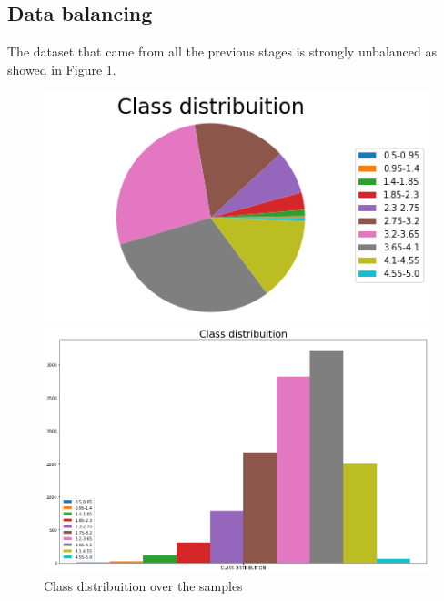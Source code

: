 \documentclass[../main]{subfiles}
\begin{document}
\subsection*{Data balancing}
The dataset that came from all the previous stages is strongly unbalanced as showed in Figure \ref{fig:unbalanced}.
\begin{figure}[h]
    \begin{minipage}[t]{.45\linewidth}
        \centering
        \includegraphics[width=\linewidth]{figures/unbalanced.png}
        
    \end{minipage}
    \hfill
    \begin{minipage}[t]{.45\linewidth}
        \centering
        
        \includegraphics[width=\linewidth]{figures/unbalance_2.png}
    \end{minipage}
    
    \caption{Class distribuition over the samples}
    

    \label{fig:unbalanced}
\end{figure}
\end{document}
